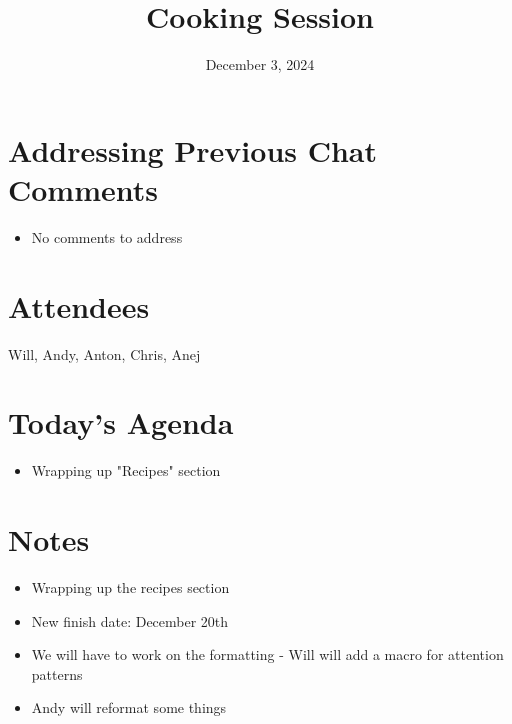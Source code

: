 \documentclass{article}
\title{Cooking Session}
\date{December 3, 2024}
\begin{document}
\maketitle

\section{Addressing Previous Chat Comments}
\begin{itemize}
   \item No comments to address
\end{itemize}

\section{Attendees}

Will, Andy, Anton, Chris, Anej

\section{Today's Agenda}
\begin{itemize}
    \item Wrapping up "Recipes" section
\end{itemize}

\section{Notes}
\begin{itemize}
    \item Wrapping up the recipes section
    \item New finish date: December 20th
    \item We will have to work on the formatting - Will will add a macro for attention patterns
    \item Andy will reformat some things
\end{itemize}



\end{document}
